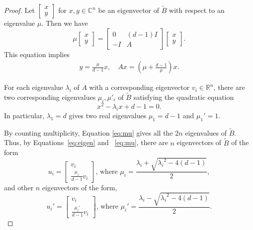 \documentclass[11pt,reqno]{amsart}
\theoremstyle{definition}
\begin{document}
\begin{proof}
Let $\begin{bmatrix}
x\\
y
\end{bmatrix} $ {for} $ x,y\in \mathbb C^{n}$ be an eigenvector of $\tilde B$ with respect to an eigenvalue $\mu$. {Then} we have  $$ \mu \begin{bmatrix}
x\\
y
\end{bmatrix} = \begin{bmatrix}
0 &  (d-1) I\\
-I  & A
\end{bmatrix} \begin{bmatrix}
x\\
y
\end{bmatrix}. $$
This equation implies \begin{align}\label{eq:eigen}
    y =  \frac{\mu}{d-1} x , \quad  Ax = \left(\mu + \frac{d-1}{\mu}\right)x .
\end{align}

For each eigenvalue $\lambda_i$ of $A$ with a corresponding eigenvector $v_i\in \mathbb R^n$, there are two corresponding {eigenvalues} $ \mu_i, \mu'_i$ {of $\tilde B$} satisfying the quadratic equation \begin{equation}\label{eq:mu}
    x^2 - \lambda_i x + d -1 = 0.
\end{equation}
In particular, $\lambda_1=d$ gives two real eigenvalues $\mu_1=d-1$ and $\mu_1'=1$.


By counting multiplicity, Equation \eqref{eq:mu} gives all the $2n$ eigenvalues of $\tilde B$. Thus, by Equations~\eqref{eq:eigen} and ~\eqref{eq:mu}, there are $n$ eigenvectors of $\tilde B$ of the form  \begin{equation}\label{eigenvector1}
u_i=    \begin{bmatrix}
v_i\\
 \frac{\mu_i}{d-1} v_i
\end{bmatrix} 
\text{, where } \mu_i = \frac{\lambda_i+\sqrt{{\lambda_i}^2-4(d-1)}}{2},
\end{equation}
and other $n$ eigenvectors of the form,
\begin{equation}\label{eigenvector2}
 u_i'=\begin{bmatrix}
v_i\\
 \frac{\mu_i'}{d-1} v_i
\end{bmatrix} 
\text{, where } \mu_i' = \frac{\lambda_i-\sqrt{{\lambda_i}^2-4(d-1)}}{2}.
\end{equation}
\end{proof}
\end{document}
